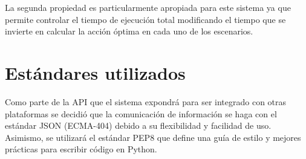 La segunda propiedad es particularmente apropiada para este sistema ya que
permite controlar el tiempo de ejecución total modificando el tiempo que se
invierte en calcular la acción óptima en cada uno de los escenarios.

\section{Estándares utilizados}

Como parte de la API que el sistema expondrá para ser integrado con otras
plataformas se decidió que la comunicación de información se haga con el
estándar JSON (ECMA-404) debido a su flexibilidad y facilidad de uso. Asimismo,
se utilizará el estándar PEP8 que define una guía de estilo y mejores prácticas
para escribir código en Python.







